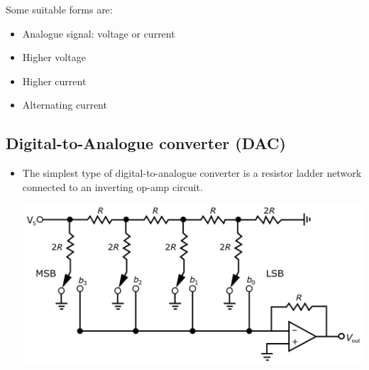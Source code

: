 \documentclass[11pt]{article}
\begin{document}
Some suitable forms are:
\begin{itemize}
\item Analogue signal: voltage or current
\item Higher voltage
\item Higher current
\item Alternating current
\end{itemize}
\subsection{Digital-to-Analogue converter (DAC)}
\label{sec:org46267cb}
\begin{itemize}
\item The simplest type of digital-to-analogue converter is a resistor ladder network connected to an inverting op-amp circuit.
\begin{center}
\includegraphics[width=.9\linewidth]{./images/digital-to-analogue-converter.png}
\end{center}
\end{itemize}

 \newpage
\end{document}
